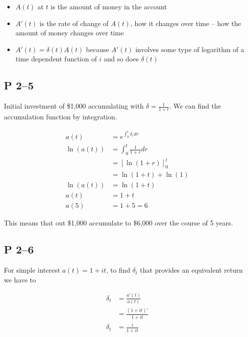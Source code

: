 \documentclass[a4paper, 12pt, reqno]{amsart}
\numberwithin{equation}{section}
\begin{document}
\begin{itemize}
    \item $A(t)$ at $t$ is the amount of money in the account
    \item $A'(t)$ is the rate of change of $A(t)$, how it changes over time --
        how the amount of money changes over time
    \item $A'(t) = \delta(t)A(t)$ because $A'(t)$ involves some type of
        logarithm of a time dependent function of $i$ and so does $\delta(t)$
\end{itemize}

\subsection*{P 2--5}

Initial investment of \$1,000 accumulating with $\delta = \frac{1}{1+t}$. We
can find the accumulation function by integration.

\begin{equation}\nonumber
    \begin{aligned}
        a(t) &= e^{\int_0^t \delta_r dr}        \\
        \ln(a(t)) &= \int_0^t \frac{1}{1+r} dr  \\
        &= \left[\ln(1+r)\right]^t_0            \\
        &= \ln(1+t) + \ln(1)                    \\
        \ln(a(t)) &= \ln(1+t)                   \\
        a(t) &= 1+t                             \\
        a(5) &= 1+5 = 6
    \end{aligned}
\end{equation}

This means that out \$1,000 accumulate to \$6,000 over the course of 5 years.

\subsection*{P 2--6}

For simple interest $a(t) = 1 + it$, to find $\delta_t$ that provides an
equivalent return we have to 

\begin{equation}\nonumber
    \begin{aligned}
        \delta_t &= \frac{a'(t)}{a(t)}          \\
        &= \frac{(1+it)'}{1+it}                 \\
        \delta_t &= \frac{i}{1+it}
    \end{aligned}
\end{equation}
\end{document}
